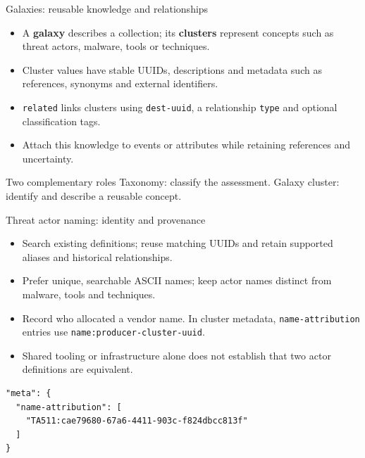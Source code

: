 \begin{frame}{Galaxies: reusable knowledge and relationships}
\begin{itemize}
  \item A \textbf{galaxy} describes a collection; its \textbf{clusters} represent concepts such as threat actors, malware, tools or techniques.
  \item Cluster values have stable UUIDs, descriptions and metadata such as references, synonyms and external identifiers.
  \item \texttt{related} links clusters using \texttt{dest-uuid}, a relationship \texttt{type} and optional classification tags.
  \item Attach this knowledge to events or attributes while retaining references and uncertainty.
\end{itemize}
\begin{block}{Two complementary roles}
Taxonomy: classify the assessment. Galaxy cluster: identify and describe a reusable concept.
\end{block}
\end{frame}

\begin{frame}[fragile]{Threat actor naming: identity and provenance}
\small
\begin{itemize}
  \item Search existing definitions; reuse matching UUIDs and retain supported aliases and historical relationships.
  \item Prefer unique, searchable ASCII names; keep actor names distinct from malware, tools and techniques.
  \item Record who allocated a vendor name. In cluster metadata, \texttt{name-attribution} entries use \texttt{name:producer-cluster-uuid}.
  \item Shared tooling or infrastructure alone does not establish that two actor definitions are equivalent.
\end{itemize}
\begin{lstlisting}[basicstyle=\ttfamily\scriptsize,breaklines=true,columns=fullflexible]
"meta": {
  "name-attribution": [
    "TA511:cae79680-67a6-4411-903c-f824dbcc813f"
  ]
}
\end{lstlisting}
\end{frame}

